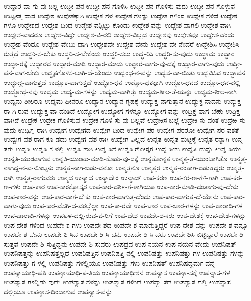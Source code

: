 ಉದ್ದಾರ-ವಾ-ಗು-ವು-ದಿಲ್ಲ
ಉದ್ದೀ-ಪನ
ಉದ್ದೀ-ಪನ-ಗೊಳಿಸಿ
ಉದ್ದೀ-ಪನ-ಗೊಳಿಸು-ವುದು
ಉದ್ದೀ-ಪನ-ಗೊಳ್ಳುವ
ಉದ್ದೀಪ್ತ-ವಾದ
ಉದ್ದೇಶ
ಉದ್ದೇಶಕ್ಕಾಗಿ
ಉದ್ದೇಶ-ಗಳ
ಉದ್ದೇಶ-ಗಳನ್ನು
ಉದ್ದೇಶ-ಗಳಿಂದ
ಉದ್ದೇಶ-ಗಳಿವೆ
ಉದ್ದೇಶ-ಗಳೂ
ಉದ್ದೇಶದ
ಉದ್ದೇಶ-ದಿಂದ
ಉದ್ದೇಶ-ವನ್ನಿಟ್ಟು-ಕೊಂಡು
ಉದ್ದೇಶ-ವನ್ನು
ಉದ್ದೇಶ-ವಾಗಲಿ
ಉದ್ದೇಶ-ವಾಗಿ
ಉದ್ದೇಶ-ವಾದರೂ
ಉದ್ದೇಶ-ವಿದ್ದೇ
ಉದ್ದೇಶ-ವಿ-ರಲಿ
ಉದ್ದೇಶ-ವಿಲ್ಲದೆ
ಉದ್ದೇಶವು
ಉದ್ದೇಶವೂ
ಉದ್ದೇಶ-ವೆಂದು
ಉದ್ದೇಶ-ವೆಂದೂ
ಉದ್ದೇಶ-ವೆಂಬು-ದಾಗಿ
ಉದ್ದೇಶವೇ
ಉದ್ದೇಶ-ವೇನು
ಉದ್ದೇಶ-ವೇ-ನೆಂದರೆ
ಉದ್ದೇಶಿಸಿ
ಉದ್ದೇಶಿಸಿ-ರುತ್ತದೆ
ಉದ್ಧರಿ-ಸ-ಬೇಕು
ಉದ್ಧರಿ-ಸ-ಬೇಕೆಂದು
ಉದ್ಧರಿ-ಸಲು
ಉದ್ಧ-ರಿಸಿ
ಉದ್ಧರಿ-ಸು-ವುದು
ಉದ್ಧಾಮ
ಉದ್ಧಾರ
ಉದ್ಧಾ-ರಕ್ಕೆ
ಉದ್ಧಾರದ
ಉದ್ಧಾರ-ಮಾಡಿ
ಉದ್ಧಾರ-ಮಾಡು
ಉದ್ಧಾರ-ವಾಗು-ವು-ದಕ್ಕೆ
ಉದ್ಧಾರ-ವಾಗು-ವುದು
ಉದ್ಧೀ-ಪನ-ವಾಗ-ಬೇಕು
ಉದ್ಧೃತಗೊಳಿಸ-ಲಾಗಿ-ದೆ-ಯೆಂದು
ಉದ್ಬಂಧ-ನ-ವನ್ನು
ಉದ್ಭವ-ವಾ-ಯಿತು
ಉದ್ಭವಿಸಿದ
ಉದ್ಭಾವನ
ಉದ್ಭುದ್ಧ-ವಾಗುತ್ತದೆ
ಉದ್ಭೂತ-ವಾಗುತ್ತದೆ
ಉದ್ಭೋ-ಧನ
ಉದ್ಭೋ-ಧನಕ್ಕಾಗಿ
ಉದ್ಭೋ-ಧನದ
ಉದ್ಭೋ-ಧನ-ದಲ್ಲಿ
ಉದ್ಭೋಧ-ನವು
ಉದ್ಯಮ
ಉದ್ಯ-ಮ-ಗಳನ್ನು
ಉದ್ಯಮ-ವಾಗಿತ್ತು
ಉದ್ಯಮ-ಶೀಲ-ತೆ-ಯನ್ನು
ಉದ್ಯಮ-ಶೀಲ-ನಾಗಿ
ಉದ್ಯಮ-ಶೀಲರೂ
ಉದ್ಯಮ-ಹೀನರೂ
ಉದ್ಯಾನ
ಉದ್ಯಾನ-ಗೃಹಕ್ಕೆ
ಉದ್ಯುಕ್ತ-ನಾಗುತ್ತಾನೆ
ಉದ್ಯುಕ್ತ-ನಾದನು
ಉದ್ಯುಕ್ತ-ರಾ-ಗಿ-ರುವ
ಉದ್ಯುಕ್ತ-ವಾ-ದಂತಿದೆ
ಉದ್ಯೋಗ
ಉದ್ಯೋಗ-ಗಳನ್ನೂ
ಉದ್ಯೋಗ-ವನ್ನು
ಉದ್ರಿಕ್ತ-ವಾಗ-ಬೇಕು
ಉದ್ರಿಕ್ತ-ವಾಗಿದೆ
ಉದ್ರೇಕ
ಉದ್ರೇಕ-ಗೊಳಿಸುವ
ಉದ್ರೇಕ-ಗೊಳಿ-ಸು-ವು-ದಿಲ್ಲವೆ
ಉದ್ರೇಕಿಸ-ಬಲ್ಲೆ
ಉದ್ರೇಕಿ-ಸು-ವಂತೆ
ಉದ್ರೇಕಿ-ಸು-ವುದು
ಉದ್ವಿಗ್ನ-ರಾಗಿ
ಉದ್ವೇಗ
ಉದ್ವೇಗದ
ಉದ್ವೇಗ-ದಿಂದ
ಉದ್ವೇಗ-ಪರ
ಉದ್ವೇಗ-ಪರರೋ
ಉದ್ವೇಗ-ಪರ-ವಶತೆ
ಉದ್ವೇಗ-ವಶ-ರಾಗ-ಕೂ-ಡದು
ಉದ್ವೇಗ-ವಶ-ರಾಗಿ
ಉದ್ವೇಗ-ವಿಲ್ಲದ
ಉನ್ನತ
ಉನ್ನತ-ಮಟ್ಟಕ್ಕೆ
ಉನ್ನತ-ರನ್ನಾಗಿ
ಉನ್ನ-ತರು
ಉನ್ನತಿ
ಉನ್ನತಿ-ಗ-ಳಲ್ಲಿ
ಉನ್ನತಿ-ಗಾಗಿ
ಉನ್ನ-ತಿಗೆ
ಉನ್ನತಿ-ಗೋಸ್ಕರ
ಉನ್ನ-ತಿಯ
ಉನ್ನತಿ-ಯನ್ನು
ಉನ್ನ-ತಿಯು
ಉನ್ನತಿ-ಯುಂಟಾಗುವ
ಉನ್ನತಿ-ಯುಂಟು-ಮಾಡಿ-ಕೊಡು-ವು-ದಕ್ಕೆ
ಉನ್ನತೋನ್ನತ
ಉನ್ಮತ್ತ-ತೆ-ಯುಂಟಾಗಿತ್ತೊ
ಉನ್ಮತ್ತ-ನಾಗಿದ್ದ-ನ-ವ-ನೊಬ್ಬನು
ಉನ್ಮತ್ತ-ನಾಗಿ-ಬಿಡು-ವನೋ
ಉನ್ಮತ್ತನೊ
ಉನ್ಮತ್ತರ
ಉನ್ಮತ್ತ-ರಂತಾಗಿ-ಬಿಡುತ್ತಿದ್ದರು
ಉನ್ಮತ್ತ-ರಾಗಿ
ಉನ್ಮತ್ತ-ರಾಗುವರು
ಉನ್ಮದ
ಉನ್ಮಾದ
ಉನ್ಮಾದೇರ
ಉನ್ಮಾದ್
ಉಪ-ಕರಣ
ಉಪ-ಕರ-ಣ-ಗಳಿ-ಗಾಗಿ
ಉಪ-ಕರ-ಣ-ಗಳು
ಉಪ-ಕಾರ
ಉಪ-ಕಾರಕ್ಕೋಸ್ಕರ
ಉಪ-ಕಾರ-ದರ್ಶಿ-ಗ-ಳಾಗಿಯೂ
ಉಪ-ಕಾರ-ಮಾಡಿ-ದಂತಾಗು-ವು-ದೇನು
ಉಪ-ಕಾರ-ವನ್ನು
ಉಪ-ಕಾರ-ವಾಗ-ಬೇಕು
ಉಪ-ಕಾರ-ವಾಗುತ್ತ-ದೆಂದು
ಉಪ-ಕಾರ-ವಾಗುತ್ತ-ದೆ-ಯೇನು
ಉಪ-ಕಾರ-ವಾಗು-ವುದು
ಉಪ-ಕಾರ-ವೆಸಗಿ-ದ-ವರಲ್ಲೆಲ್ಲಾ
ಉಪ-ಕಾ-ರವೇ
ಉಪ-ಚಾರ
ಉಪ-ಚಾರ-ಗಳನ್ನು
ಉಪ-ಚಾರಾದಿ-ಗಳ
ಉಪ-ಚಾರಾದಿ-ಗಳನ್ನು
ಉಪಟಳ-ದಲ್ಲಿ-ರುವ-ವ-ರಿಗೆ
ಉಪ-ದೇಶ
ಉಪದೇ-ಶ-ಕರು
ಉಪ-ದೇಶಕ್ಕೆ
ಉಪ-ದೇಶ-ಗಳನ್ನು
ಉಪ-ದೇಶ-ಗಳಿಂದ
ಉಪದೇ-ಶ-ಗಳು
ಉಪದೇ-ಶದ
ಉಪದೇ-ಶ-ಮಾಡುತ್ತಿದ್ದರೆ
ಉಪ-ದೇಶ-ವನ್ನು
ಉಪದೇ-ಶ-ವನ್ನೂ
ಉಪದೇ-ಶ-ವೇನು
ಉಪದೇ-ಶಿ-ಸಿದ
ಉಪದೇ-ಶಿ-ಸಿ-ದನು
ಉಪದೇ-ಶಿ-ಸಿ-ದರು
ಉಪದೇ-ಶಿಸಿ-ಬಿಟ್ಟಿದ್ದಾರೆ
ಉಪದೇ-ಶಿ-ಸುತ್ತವೆ
ಉಪದೇ-ಶಿ-ಸುತ್ತಿದ್ದನು
ಉಪದೇ-ಶಿ-ಸುವರು
ಉಪದ್ರವ
ಉಪ-ನಯನ
ಉಪ-ನಯನ-ವೆಂದು
ಉಪನಿಷತ್
ಉಪನಿಷತ್ತನ್ನು
ಉಪನಿಷತ್ತಲ್ಲದೆ
ಉಪನಿಷತ್ತಿನ
ಉಪನಿಷತ್ತಿ-ನಲ್ಲಿ
ಉಪನಿಷತ್ತು
ಉಪನಿಷತ್ತು-ಗಳ
ಉಪನಿಷತ್ತು-ಗಳನ್ನು
ಉಪನಿಷತ್ತು-ಗ-ಳಲ್ಲಿ
ಉಪನಿಷತ್ತು-ಗಳಲ್ಲಿಯೂ
ಉಪನಿಷತ್ತು-ಗಳು
ಉಪನಿಷತ್‌
ಉಪನಿಷದ್ಧರ್ಮ-ವನ್ನೆ
ಉಪನ್ಯಾಯಾಧಿ-ಪತಿ
ಉಪನ್ಯಾಯಾಧಿ-ಪ-ತಿಯ
ಉಪನ್ಯಾಯಾಧೀಶನ
ಉಪನ್ಯಾಸ
ಉಪನ್ಯಾ-ಸಕ್ಕೆ
ಉಪನ್ಯಾಸ-ಗಳ
ಉಪನ್ಯಾಸ-ಗಳನ್ನಿಡು-ವುದು
ಉಪನ್ಯಾಸ-ಗಳನ್ನು
ಉಪನ್ಯಾಸ-ಗಳಿಂದ
ಉಪನ್ಯಾ-ಸದ
ಉಪನ್ಯಾಸ-ದಲ್ಲಿ
ಉಪನ್ಯಾಸ-ದಲ್ಲಿಯೂ
ಉಪನ್ಯಾಸ-ದಿಂದಾಗುವ
ಉಪನ್ಯಾಸ-ವನ್ನು
